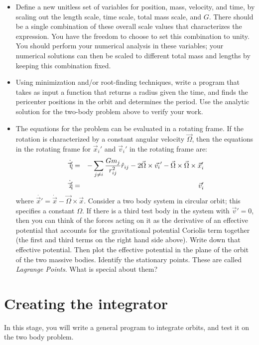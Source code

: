 \documentclass[11pt, preprint]{aastex}
\begin{document}
\begin{itemize}
\item Define a new unitless set of variables for position, mass,
  velocity, and time, by scaling out the length scale, time scale,
  total mass scale, and $G$. There should be a single combination of
  these overall scale values that characterizes the expression. You
  have the freedom to choose to set this combination to unity. You
  should perform your numerical analysis in these variables; your
  numerical solutions can then be scaled to different total mass and
  lengths by keeping this combination fixed.
\item Using minimization and/or root-finding techniques, write a
  program that takes as input a function that returns a radius given
  the time, and finds the pericenter positions in the orbit and
  determines the period. Use the analytic solution for the two-body
  problem above to verify your work.
\item The equations for the problem can be evaluated in a rotating
  frame. If the rotation is characterized by a constant angular
  velocity $\vec{\Omega}$, then the equations in the rotating frame
  for $\vec{x}_i'$ and $\vec{v}_i'$ in the rotating frame are:
  \begin{eqnarray}
    \dot{\vec{v}_i'} &=& - \sum_{j \ne i} \frac{Gm_j}{r_{ij}^2} {\hat
      r}_{ij}
    -2 \vec{\Omega}\times\vec{v_i}' -
    \vec{\Omega}\times\vec{\Omega}\times\vec{x}_i'  \cr
    \dot{\vec{x}_i'} &=& \vec{v}_i'
  \end{eqnarray}
  where $\dot{\vec{x}'} = \dot{\vec{x}} - \vec\Omega \times \vec{x}$.
  Consider a two body system in circular orbit; this specifies a
  constant $\Omega$. If there is a third test body in the system with
  $\vec{v}'=0$, then you can think of the forces acting on it as the
  derivative of an effective potential that accounts for the
  gravitational potential Coriolis term together (the first and third
  terms on the right hand side above). Write down that effective
  potential. Then plot the effective potential in the plane of the
  orbit of the two massive bodies. Identify the stationary
  points. These are called {\it Lagrange Points}. What is special
  about them?
\end{itemize}

\section{Creating the integrator}

In this stage, you will write a general program to integrate orbits,
and test it on the two body problem.
  
\end{document}
